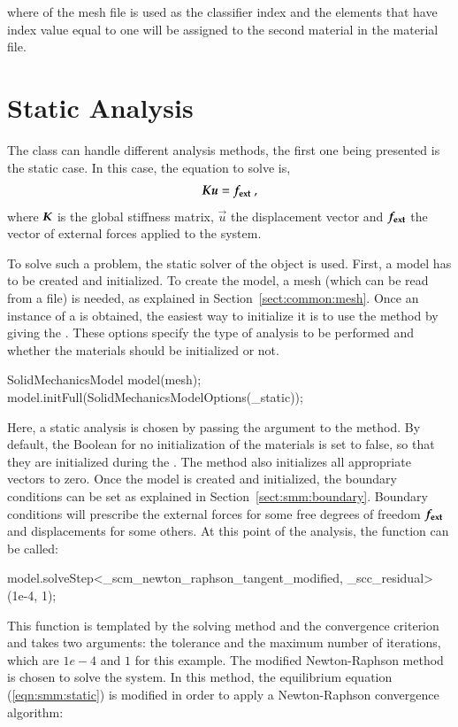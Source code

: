 where  of the mesh file is used as the classifier index
and the elements that have index value equal to one will be assigned
to the second material in the material file.


\section{Static Analysis\label{sect:smm:static}}

The  class can handle different analysis
methods, the first one being presented is the static case.  In this
case, the equation to solve is,
\begin{equation}
  \label{eqn:smm:static} \boldsymbol{K} \boldsymbol{u} =
  \boldsymbol{f_{{\mathrm{ext}}}}~,
\end{equation}
where $\boldsymbol{K}$ is the global stiffness matrix, $\vec{u}$ the
displacement vector and $\boldsymbol{f_{{\mathrm{ext}}}}$ the vector of external
forces applied to the system.

To solve such a problem, the static solver of the
 object is used.
First, a model has to be created and initialized.  To create the
model, a mesh (which can be read from a file) is needed, as explained
in Section~\ref{sect:common:mesh}.  Once an instance of a
 is obtained, the easiest way to initialize
it is to use the 
method by giving the . These options
specify the type of analysis to be performed and whether the materials
should be initialized or not.
\begin{cpp}
SolidMechanicsModel model(mesh);
model.initFull(SolidMechanicsModelOptions(_static));
\end{cpp}
Here, a static analysis is chosen by passing the argument
 to the method. By default, the Boolean for no
initialization of the materials is set to false, so that they are
initialized during the . The method 
also initializes all appropriate vectors to zero.  Once the model is
created and initialized, the boundary conditions can be set as
explained in Section~\ref{sect:smm:boundary}.  Boundary conditions
will prescribe the external forces for some free degrees of freedom
$\boldsymbol{f_{{\mathrm{ext}}}}$ and displacements for some others.  At this point
of the analysis, the function
 can be called:
\begin{cpp}
model.solveStep<_scm_newton_raphson_tangent_modified, _scc_residual>(1e-4, 1);
\end{cpp}
This function is templated by the solving method and the convergence
criterion and takes two arguments: the tolerance and the maximum
number of iterations, which are $1e-4$ and $1$ for this example. The
modified Newton-Raphson method is chosen to solve the system. In this
method, the equilibrium equation (\ref{eqn:smm:static}) is modified in
order to apply a Newton-Raphson convergence algorithm:

